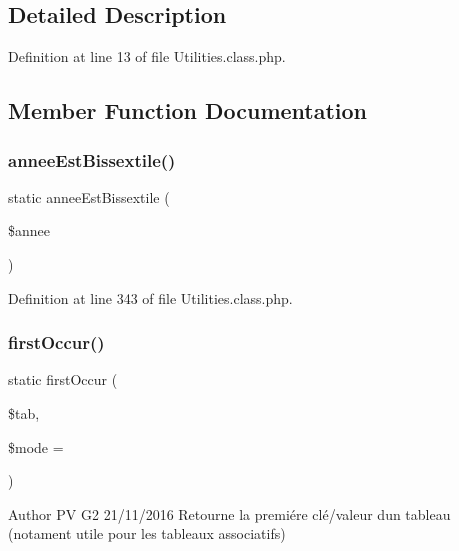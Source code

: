 \subsection{Detailed Description}


Definition at line 13 of file Utilities.\+class.\+php.



\subsection{Member Function Documentation}
\mbox{\label{class_utilities_ac554970f7f045a6373fc80aacfd3c11b}} 
\subsubsection{\texorpdfstring{annee\+Est\+Bissextile()}{anneeEstBissextile()}}
{\footnotesize\ttfamily static annee\+Est\+Bissextile (\begin{DoxyParamCaption}\item[{}]{\$annee }\end{DoxyParamCaption})\hspace{0.3cm}{\ttfamily [static]}}



Definition at line 343 of file Utilities.\+class.\+php.

\mbox{\label{class_utilities_a3db97c6e1efe4c47efaf00d4e5f2163a}} 
\subsubsection{\texorpdfstring{first\+Occur()}{firstOccur()}}
{\footnotesize\ttfamily static first\+Occur (\begin{DoxyParamCaption}\item[{}]{\$tab,  }\item[{}]{\$mode = {} }\end{DoxyParamCaption})\hspace{0.3cm}{\ttfamily [static]}}

\begin{DoxyAuthor}{Author}
PV G2 21/11/2016 Retourne la premiére clé/valeur d\textquotesingle{}un tableau (notament utile pour les tableaux associatifs) 
\end{DoxyAuthor}

